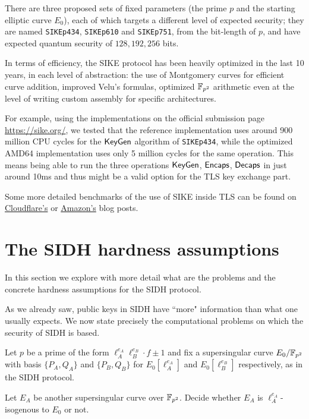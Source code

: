 There are three proposed sets of fixed parameters (the prime $p$ and the starting elliptic curve $E_0$), each of which targets a different level of expected security; they are named \texttt{SIKEp434}, \texttt{SIKEp610} and \texttt{SIKEp751}, from the bit-length of $p$, and have expected quantum security of $128, 192, 256$ bits.

In terms of efficiency, the SIKE protocol has been heavily optimized in the last 10 years, in each level of abstraction: the use of Montgomery curves for efficient curve addition, improved Velu's formulas, optimized $\mathbb{F}_{p^2}$ arithmetic even at the level of writing custom assembly for specific architectures.

For example, using the implementations on the official submission page \url{https://sike.org/},
we tested that the reference implementation uses around 900 million CPU cycles for the $\mathsf{KeyGen}$ algorithm of \texttt{SIKEp434}, while the optimized AMD64 implementation uses only 5 million cycles for the same operation. This means being able to run the three operations $\mathsf{KeyGen}$, $\mathsf{Encaps}$, $\mathsf{Decaps}$ in just around 10ms and thus might be a valid option for the TLS key exchange part.

Some more detailed benchmarks of the use of SIKE inside TLS can be found on \href{https://blog.cloudflare.com/the-tls-post-quantum-experiment/}{Cloudflare's} or \href{https://aws.amazon.com/it/blogs/security/round-2-hybrid-post-quantum-tls-benchmarks/}{Amazon's} blog posts.

\section{The SIDH hardness assumptions}
In this section we explore with more detail what are the problems and the concrete hardness assumptions for the SIDH protocol.

As we already saw, public keys in SIDH have ``more" information than what one usually expects. We now state precisely the computational problems on which the security of SIDH is based.

Let $p$ be a prime of the form $\ell_A^{e_A}\ell_B^{e_B}\cdot f\pm1$ and fix a supersingular curve $E_0/\mathbb{F}_{p^2}$ with basis $\{P_A,Q_A\}$ and $\{P_B,Q_B\}$ for $E_0[\ell_A^{e_A}]$ and $E_0[\ell_B^{e_B}]$ respectively, as in the SIDH protocol.

\begin{problem}
    Let $E_A$ be another supersingular curve over $\mathbb{F}_{p^2}$. Decide whether $E_A$ is $\ell_A^{e_A}$-isogenous to $E_0$ or not.
\end{problem}

